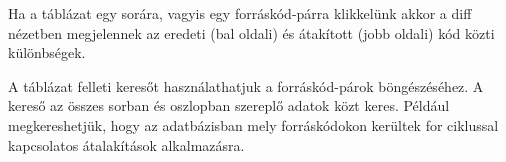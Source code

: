 Ha a táblázat egy sorára, vagyis egy forráskód-párra klikkelünk
akkor a diff nézetben megjelennek az eredeti (bal oldali) és átakított (jobb oldali)
kód közti különbségek.

A táblázat felleti keresőt használathatjuk a forráskód-párok böngészéséhez.
A kereső az összes sorban és oszlopban szereplő adatok közt keres.
Például megkereshetjük, hogy az adatbázisban mely forráskódokon kerültek
for ciklussal kapcsolatos átalakítások alkalmazásra.